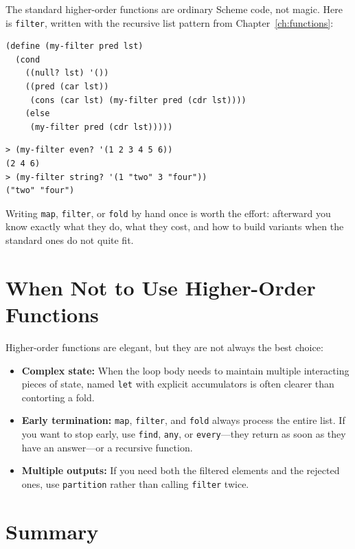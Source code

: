 The standard higher-order functions are ordinary Scheme code, not magic. Here is \texttt{filter}, written with the recursive list pattern from Chapter~\ref{ch:functions}:

\begin{lstlisting}
(define (my-filter pred lst)
  (cond
    ((null? lst) '())
    ((pred (car lst))
     (cons (car lst) (my-filter pred (cdr lst))))
    (else
     (my-filter pred (cdr lst)))))
\end{lstlisting}

\begin{lstlisting}[style=repl]
> (my-filter even? '(1 2 3 4 5 6))
(2 4 6)
> (my-filter string? '(1 "two" 3 "four"))
("two" "four")
\end{lstlisting}

Writing \texttt{map}, \texttt{filter}, or \texttt{fold} by hand once is worth the effort: afterward you know exactly what they do, what they cost, and how to build variants when the standard ones do not quite fit.

\section{When Not to Use Higher-Order Functions}

Higher-order functions are elegant, but they are not always the best choice:

\begin{itemize}
    \item \textbf{Complex state:} When the loop body needs to maintain multiple interacting pieces of state, named \texttt{let} with explicit accumulators is often clearer than contorting a fold.
    \item \textbf{Early termination:} \texttt{map}, \texttt{filter}, and \texttt{fold} always process the entire list. If you want to stop early, use \texttt{find}, \texttt{any}, or \texttt{every}---they return as soon as they have an answer---or a recursive function.
    \item \textbf{Multiple outputs:} If you need both the filtered elements and the rejected ones, use \texttt{partition} rather than calling \texttt{filter} twice.
\end{itemize}

\section*{Summary}

